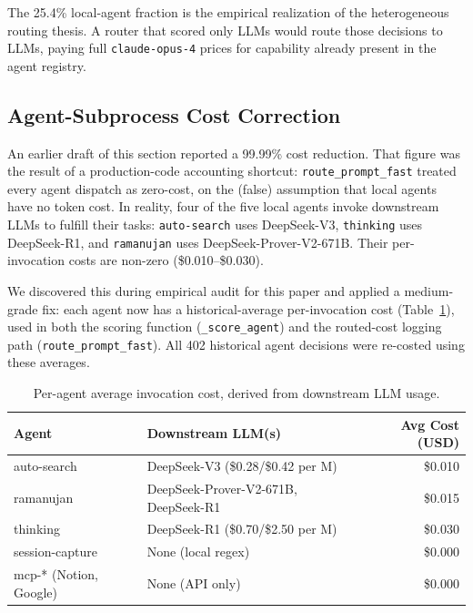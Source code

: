 The 25.4\% local-agent fraction is the empirical realization of the heterogeneous routing thesis. A router that scored only LLMs would route those decisions to LLMs, paying full \texttt{claude-opus-4} prices for capability already present in the agent registry.

\subsection{Agent-Subprocess Cost Correction}
\label{sec:agent_cost_correction}

An earlier draft of this section reported a 99.99\% cost reduction. That figure was the result of a production-code accounting shortcut: \texttt{route\_prompt\_fast} treated every agent dispatch as zero-cost, on the (false) assumption that local agents have no token cost. In reality, four of the five local agents invoke downstream LLMs to fulfill their tasks: \texttt{auto-search} uses DeepSeek-V3, \texttt{thinking} uses DeepSeek-R1, and \texttt{ramanujan} uses DeepSeek-Prover-V2-671B. Their per-invocation costs are non-zero (\$0.010--\$0.030).

We discovered this during empirical audit for this paper and applied a medium-grade fix: each agent now has a historical-average per-invocation cost (Table~\ref{tab:agent_costs}), used in both the scoring function (\texttt{\_score\_agent}) and the routed-cost logging path (\texttt{route\_prompt\_fast}). All 402 historical agent decisions were re-costed using these averages.

\begin{table}[h]
\centering
\caption{Per-agent average invocation cost, derived from downstream LLM usage.}
\label{tab:agent_costs}
\small
\begin{tabular}{llr}
\toprule
\textbf{Agent} & \textbf{Downstream LLM(s)} & \textbf{Avg Cost (USD)} \\
\midrule
auto-search & DeepSeek-V3 (\$0.28/\$0.42 per M) & \$0.010 \\
ramanujan & DeepSeek-Prover-V2-671B, DeepSeek-R1 & \$0.015 \\
thinking & DeepSeek-R1 (\$0.70/\$2.50 per M) & \$0.030 \\
session-capture & None (local regex) & \$0.000 \\
mcp-* (Notion, Google) & None (API only) & \$0.000 \\
\bottomrule
\end{tabular}
\end{table}

